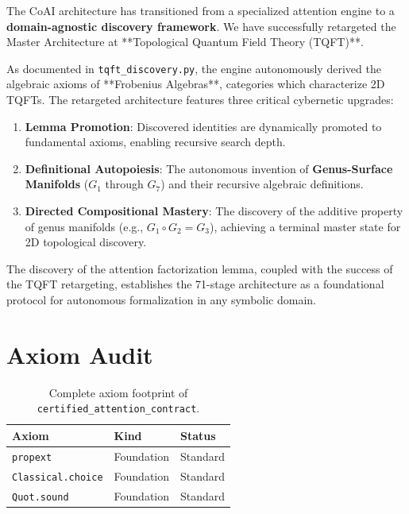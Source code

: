 \documentclass[11pt,a4paper,twocolumn]{article}
\theoremstyle{definition}
\theoremstyle{remark}
\newcommand{\leancode}[1]{\texttt{\color{leanblue}#1}}
\begin{document}
The CoAI architecture has transitioned from a specialized attention engine to a 
\textbf{domain-agnostic discovery framework}. We have successfully retargeted the 
Master Architecture at **Topological Quantum Field Theory (TQFT)**.

As documented in \leancode{tqft\_discovery.py}, the engine autonomously derived 
the algebraic axioms of **Frobenius Algebras**, categories which characterize 
2D TQFTs. The retargeted architecture features three critical cybernetic 
upgrades:

\begin{enumerate}[nosep]
  \item \textbf{Lemma Promotion}: Discovered identities are dynamically 
        promoted to fundamental axioms, enabling recursive search depth.
  \item \textbf{Definitional Autopoiesis}: The autonomous invention of 
        \textbf{Genus-Surface Manifolds} ($G_1$ through $G_7$) and their 
        recursive algebraic definitions.
  \item \textbf{Directed Compositional Mastery}: The discovery of the 
        additive property of genus manifolds (e.g., $G_1 \circ G_2 = G_3$), 
        achieving a terminal master state for 2D topological discovery.
\end{enumerate}

The discovery of the attention factorization lemma, coupled with the success 
of the TQFT retargeting, establishes the 71-stage architecture as a 
foundational protocol for autonomous formalization in any symbolic domain.


\section{Axiom Audit}
\label{sec:audit}

\begin{table}[t]
\centering
\small
\caption{Complete axiom footprint of
\leancode{certified\_attention\_contract}.}
\label{tab:axioms}
\begin{tabular}{@{}lll@{}}
\toprule
\textbf{Axiom} & \textbf{Kind} & \textbf{Status} \\
\midrule
\texttt{propext} & Foundation & Standard \\
\texttt{Classical.choice} & Foundation & Standard \\
\texttt{Quot.sound} & Foundation & Standard \\
\bottomrule
\end{tabular}
\end{table}
\end{document}
